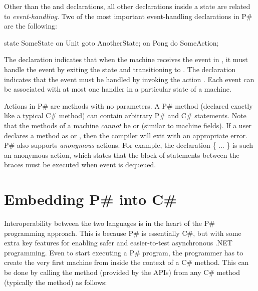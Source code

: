 \documentclass{llncs}
\newcommand{\ps}{P\#\xspace}
\newcommand{\cs}{C\#\xspace}
\begin{document}
Other than the  and  declarations, all other declarations inside a state are related to \emph{event-handling}. Two of the most important event-handling declarations in \ps are the following:

\begin{psharpNoLines}
state SomeState {
  on Unit goto AnotherState;
  on Pong do SomeAction;
}
\end{psharpNoLines}

\noindent
The declaration  indicates that when the machine receives the  event in , it must handle the event by exiting the
state and transitioning to . The declaration  indicates that the  event must be handled by invoking the action . Each event can be associated with at most one handler in a particular state of a machine.

Actions in \ps are methods with no parameters. A \ps method (declared exactly like a typical \cs method) can contain arbitrary \ps and \cs statements. Note that the methods of a machine \emph{cannot} be  or  (similar to machine fields). If a user declares a method as  or , then the compiler will exit with an appropriate error. \ps also supports \emph{anonymous} actions. For example, the declaration  \{ ... \} is such an anonymous action, which states that the block of statements between the braces must be executed when event  is dequeued.\\


\section{Embedding \ps into \cs}
\label{sec:ps2cs}

Interoperability between the two languages is in the heart of the \ps programming approach. This is because \ps is essentially \cs, but with some extra key features for enabling safer and easier-to-test asynchronous .NET programming. Even to start executing a \ps program, the programmer has to create the very first machine from inside the context of a \cs method. This can be done by calling the  method (provided by the  APIs) from any \cs method (typically the  method) as follows:
\end{document}
